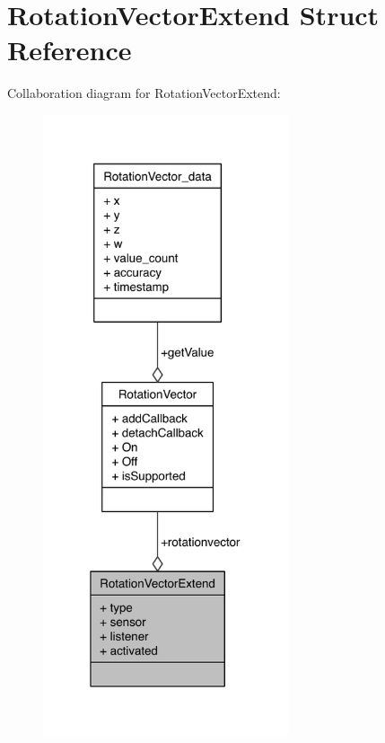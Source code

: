 \section{Rotation\-Vector\-Extend Struct Reference}
\label{structRotationVectorExtend}


Collaboration diagram for Rotation\-Vector\-Extend\-:
\nopagebreak
\begin{figure}[H]
\begin{center}
\leavevmode
\includegraphics[width=205pt]{structRotationVectorExtend__coll__graph}
\end{center}
\end{figure}
